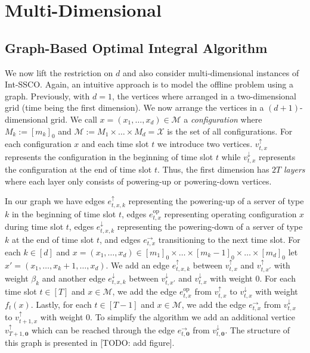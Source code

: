 \section{Multi-Dimensional}

\subsection{Graph-Based Optimal Integral Algorithm}

We now lift the restriction on $d$ and also consider multi-dimensional instances of Int-SSCO. Again, an intuitive approach is to model the offline problem using a graph. Previously, with $d = 1$, the vertices where arranged in a two-dimensional grid (time being the first dimension). We now arrange the vertices in a $(d+1)$-dimensional grid. We call $x = (x_1, \dots, x_d) \in \mathcal{M}$ a \emph{configuration} where $M_k := [m_k]_0$ and $\mathcal{M} := M_1 \times \dots \times M_d = \mathcal{X}$ is the set of all configurations. For each configuration $x$ and each time slot $t$ we introduce two vertices. $v_{t,x}^{\uparrow}$ represents the configuration in the beginning of time slot $t$ while $v_{t,x}^{\downarrow}$ represents the configuration at the end of time slot $t$. Thus, the first dimension has $2 T$ \emph{layers} where each layer only consists of powering-up or powering-down vertices.

In our graph we have edges $e_{t,x,k}^{\uparrow}$ representing the powering-up of a server of type $k$ in the beginning of time slot $t$, edges $e_{t,x}^{\text{op}}$ representing operating configuration $x$ during time slot $t$, edges $e_{t,x,k}^{\downarrow}$ representing the powering-down of a server of type $k$ at the end of time slot $t$, and edges $e_{t,x}^{\rightarrow}$ transitioning to the next time slot. For each $k \in [d]$ and $x = (x_1, \dots, x_d) \in [m_1]_0 \times \dots \times [m_k - 1]_0 \times \dots \times [m_d]_0$ let $x' = (x_1, \dots, x_k + 1, \dots, x_d)$. We add an edge $e_{t,x,k}^{\uparrow}$ between $v_{t,x}^{\uparrow}$ and $v_{t,x'}^{\uparrow}$ with weight $\beta_k$ and another edge $e_{t,x,k}^{\downarrow}$ between $v_{t,x'}^{\downarrow}$ and $v_{t,x}^{\downarrow}$ with weight $0$. For each time slot $t \in [T]$ and $x \in \mathcal{M}$, we add the edge $e_{t,x}^{\text{op}}$ from $v_{t,x}^{\uparrow}$ to $v_{t,x}^{\downarrow}$ with weight $f_t(x)$. Lastly, for each $t \in [T-1]$ and $x \in \mathcal{M}$, we add the edge $e_{t,x}^{\rightarrow}$ from $v_{t,x}^{\downarrow}$ to $v_{t+1,x}^{\uparrow}$ with weight $0$.  To simplify the algorithm we add an additional vertice $v_{T+1,\mathbf{0}}^{\uparrow}$ which can be reached through the edge $e_{t,\mathbf{0}}^{\rightarrow}$ from $v_{t,\mathbf{0}}^{\downarrow}$. The structure of this graph is presented in [TODO: add figure].

